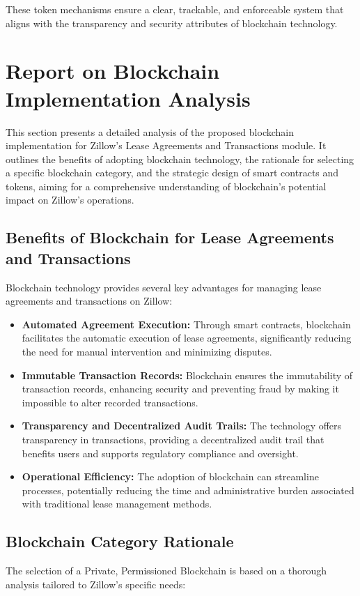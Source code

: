 \documentclass{article}
\begin{document}
These token mechanisms ensure a clear, trackable, and enforceable system that aligns with the transparency and security attributes of blockchain technology.

\section{Report on Blockchain Implementation Analysis}

This section presents a detailed analysis of the proposed blockchain implementation for Zillow's Lease Agreements and Transactions module. It outlines the benefits of adopting blockchain technology, the rationale for selecting a specific blockchain category, and the strategic design of smart contracts and tokens, aiming for a comprehensive understanding of blockchain's potential impact on Zillow's operations.

\subsection{Benefits of Blockchain for Lease Agreements and Transactions}
Blockchain technology provides several key advantages for managing lease agreements and transactions on Zillow:

\begin{itemize}
    \item \textbf{Automated Agreement Execution:} Through smart contracts, blockchain facilitates the automatic execution of lease agreements, significantly reducing the need for manual intervention and minimizing disputes.
    \item \textbf{Immutable Transaction Records:} Blockchain ensures the immutability of transaction records, enhancing security and preventing fraud by making it impossible to alter recorded transactions.
    \item \textbf{Transparency and Decentralized Audit Trails:} The technology offers transparency in transactions, providing a decentralized audit trail that benefits users and supports regulatory compliance and oversight.
    \item \textbf{Operational Efficiency:} The adoption of blockchain can streamline processes, potentially reducing the time and administrative burden associated with traditional lease management methods.
\end{itemize}

\subsection{Blockchain Category Rationale}
The selection of a Private, Permissioned Blockchain is based on a thorough analysis tailored to Zillow's specific needs:
\end{document}
